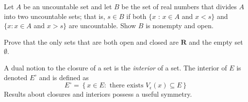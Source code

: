 \begin{solution}
\end{solution}

\begin{exercise}
\end{exercise}

\begin{solution}
  \enum{
  \item \TODO
  \item \TODO
  }
\end{solution}

\begin{exercise}
  Let $A$ be an uncountable set and let $B$ be the set of real numbers that divides $A$ into two uncountable sets; that is, $s \in B$ if both $\{x$ : $x \in A$ and $x<s\}$ and $\{x: x \in A$ and $x>s\}$ are uncountable. Show $B$ is nonempty and open.
\end{exercise}

\begin{solution}
  \TODO
\end{solution}

\begin{exercise}
  Prove that the only sets that are both open and closed are $\mathbf{R}$ and the empty set $\emptyset$.
\end{exercise}

\begin{solution}
  \TODO
\end{solution}

\begin{exercise}
  A dual notion to the closure of a set is the \emph{interior} of a set. The interior of $E$ is denoted $E^{\circ}$ and is defined as
  $$
  E^{\circ}=\left\{x \in E: \text { there exists } V_{\epsilon}(x) \subseteq E\right\}
  $$
  Results about closures and interiors possess a useful symmetry.
\end{exercise}

